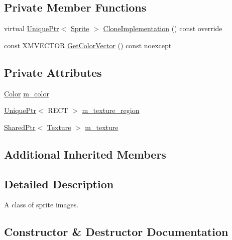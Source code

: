 \subsection*{Private Member Functions}
\begin{DoxyCompactItemize}
\item 
virtual \hyperlink{namespacemage_a3316d7143a973e37adf1110f2e80ca31}{Unique\+Ptr}$<$ \hyperlink{classmage_1_1_sprite}{Sprite} $>$ \hyperlink{classmage_1_1_sprite_image_ad6460971fc4ffb425b7a43d27c9b05b2}{Clone\+Implementation} () const override
\item 
const X\+M\+V\+E\+C\+T\+OR \hyperlink{classmage_1_1_sprite_image_a65e6a26e2589afa2c6ccc463e7dd4264}{Get\+Color\+Vector} () const noexcept
\end{DoxyCompactItemize}
\subsection*{Private Attributes}
\begin{DoxyCompactItemize}
\item 
\hyperlink{structmage_1_1_color}{Color} \hyperlink{classmage_1_1_sprite_image_a63331a3170f5af1a14b15913afc59ce2}{m\+\_\+color}
\item 
\hyperlink{namespacemage_a3316d7143a973e37adf1110f2e80ca31}{Unique\+Ptr}$<$ R\+E\+CT $>$ \hyperlink{classmage_1_1_sprite_image_a8d20ef6d6470dc01f73a599060953b65}{m\+\_\+texture\+\_\+region}
\item 
\hyperlink{namespacemage_a1e01ae66713838a7a67d30e44c67703e}{Shared\+Ptr}$<$ \hyperlink{classmage_1_1_texture}{Texture} $>$ \hyperlink{classmage_1_1_sprite_image_a8416fc862782dc019e15275261e7ca15}{m\+\_\+texture}
\end{DoxyCompactItemize}
\subsection*{Additional Inherited Members}


\subsection{Detailed Description}
A class of sprite images. 

\subsection{Constructor \& Destructor Documentation}
\hypertarget{classmage_1_1_sprite_image_a5e8e61ee100421100c3a065ae2cc2ad3}{}\label{classmage_1_1_sprite_image_a5e8e61ee100421100c3a065ae2cc2ad3} 
